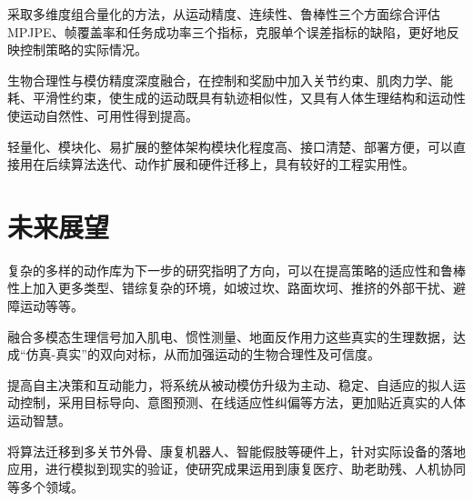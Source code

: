 采取多维度组合量化的方法，从运动精度、连续性、鲁棒性三个方面综合评估MPJPE、帧覆盖率和任务成功率三个指标，克服单个误差指标的缺陷，更好地反映控制策略的实际情况。

生物合理性与模仿精度深度融合，在控制和奖励中加入关节约束、肌肉力学、能耗、平滑性约束，使生成的运动既具有轨迹相似性，又具有人体生理结构和运动性使运动自然性、可用性得到提高。

轻量化、模块化、易扩展的整体架构模块化程度高、接口清楚、部署方便，可以直接用在后续算法迭代、动作扩展和硬件迁移上，具有较好的工程实用性。

\section{未来展望}\label{ux672aux6765ux5c55ux671b}

复杂的多样的动作库为下一步的研究指明了方向，可以在提高策略的适应性和鲁棒性上加入更多类型、错综复杂的环境，如坡过坎、路面坎坷、推挤的外部干扰、避障运动等等。

融合多模态生理信号加入肌电、惯性测量、地面反作用力这些真实的生理数据，达成“仿真-真实”的双向对标，从而加强运动的生物合理性及可信度。

提高自主决策和互动能力，将系统从被动模仿升级为主动、稳定、自适应的拟人运动控制，采用目标导向、意图预测、在线适应性纠偏等方法，更加贴近真实的人体运动智慧。

将算法迁移到多关节外骨、康复机器人、智能假肢等硬件上，针对实际设备的落地应用，进行模拟到现实的验证，使研究成果运用到康复医疗、助老助残、人机协同等多个领域。
